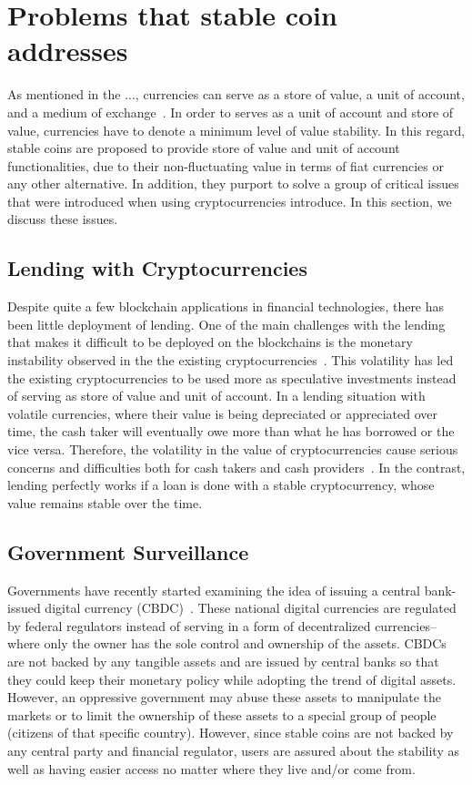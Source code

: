 \section{Problems that stable coin addresses}
As mentioned in the ..., currencies can serve as a store of value, a unit of account, and a medium of exchange~\cite{smithin2002money}. In order to serves as a unit of account and store of value, currencies have to denote a minimum level of value stability. In this regard, stable coins are proposed to provide store of value and unit of account functionalities, due to their non-fluctuating value in terms of fiat currencies or any other alternative. In addition, they purport to solve a group of critical issues that were introduced when using cryptocurrencies introduce. In this section, we discuss these issues. 

\subsection{Lending with Cryptocurrencies} 
Despite quite a few blockchain applications in financial technologies, there has been little deployment of lending. One of the main challenges with the lending that makes it difficult to be deployed on the blockchains is the monetary instability observed in the the existing cryptocurrencies~\cite{okoyetoward}. This volatility has led the existing cryptocurrencies to be used more as speculative investments instead of serving as store of value and unit of account. In a lending situation with volatile currencies, where their value is being depreciated or appreciated over time, the cash taker will eventually owe more than what he has borrowed or the vice versa. Therefore, the volatility in the value of cryptocurrencies cause serious concerns and difficulties both for cash takers and cash providers~\cite{okoyetoward}. In the contrast, lending perfectly works if a loan is done with a stable cryptocurrency, whose value remains stable over the time. 

\subsection{Government Surveillance}

Governments have recently started examining  the idea of issuing a central bank-issued digital currency (CBDC)~\cite{barrdear2016macroeconomics}. These national digital currencies are regulated by federal regulators instead of serving in a form of decentralized currencies-- where only the owner has the sole control and ownership of the assets. CBDCs are not backed by any tangible assets and are issued by central banks so that they could keep their monetary policy while adopting the trend of digital assets. However, an oppressive government may abuse these assets to manipulate the markets or to limit the ownership of these assets to  a special group of people (\eg citizens of that specific country). However, since stable coins are not backed by any central party and financial regulator, users are assured about the stability as well as having easier access no matter where they live and/or come from.



